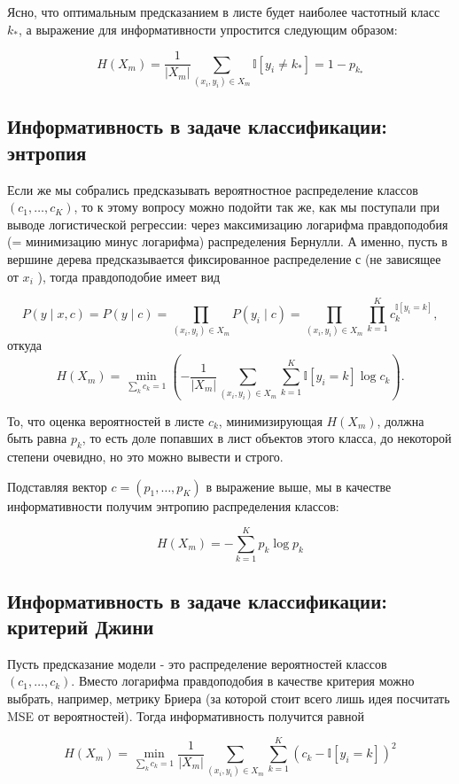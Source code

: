 \begin{itemize}
Ясно, что оптимальным предсказанием в листе будет наиболее частотный класс \(k_{*}\), а выражение для информативности упростится следующим образом:

\[
H\left(X_{m}\right)=\frac{1}{\left|X_{m}\right|} \sum_{\left(x_{i}, y_{i}\right) \in X_{m}} \mathbb{I}\left[y_{i} \neq k_{*}\right]=1-p_{k_{*}}
\]

\subsection*{Информативность в задаче классификации: энтропия}
Если же мы собрались предсказывать вероятностное распределение классов \(\left(c_{1}, \ldots, c_{K}\right)\), то к этому вопросу можно подойти так же, как мы поступали при выводе логистической регрессии: через максимизацию логарифма правдоподобия (= минимизацию минус логарифма) распределения Бернулли. А именно, пусть в вершине дерева предсказывается фиксированное распределение \(с\) (не зависящее от \(x_{i}\) ), тогда правдоподобие имеет вид

\[
P(y \mid x, c) = P(y \mid c) = \prod_{(x_i, y_i) \in X_m} P(y_i \mid c) = \prod_{(x_i, y_i) \in X_m} \prod_{k=1}^K c_k^{\mathbb{I}[y_i = k]},
\]
откуда
\[
H(X_m) = \min_{\sum_k c_k = 1} \left( - \frac{1}{|X_m|} \sum_{(x_i, y_i) \in X_m} \sum_{k=1}^K \mathbb{I}[y_i = k] \log c_k \right).
\]

То, что оценка вероятностей в листе \(c_{k}\), минимизирующая \(H\left(X_{m}\right)\), должна быть равна \(p_{k}\), то есть доле попавших в лист объектов этого класса, до некоторой степени очевидно, но это можно вывести и строго.

Подставляя вектор \(c=\left(p_{1}, \ldots, p_{K}\right)\) в выражение выше, мы в качестве информативности получим энтропию распределения классов:

\[
H\left(X_{m}\right)=-\sum_{k=1}^{K} p_{k} \log p_{k}
\]

\subsection*{Информативность в задаче классификации: критерий Джини}
Пусть предсказание модели - это распределение вероятностей классов \(\left(c_{1}, \ldots, c_{k}\right)\). Вместо логарифма правдоподобия в качестве критерия можно выбрать, например, метрику Бриера (за которой стоит всего лишь идея посчитать MSE от вероятностей). Тогда информативность получится равной

\[
H\left(X_{m}\right)=\min _{\sum_{k} c_{k}=1} \frac{1}{\left|X_{m}\right|} \sum_{\left(x_{i}, y_{i}\right) \in X_{m}} \sum_{k=1}^{K}\left(c_{k}-\mathbb{I}\left[y_{i}=k\right]\right)^{2}
\]


\end{itemize}
